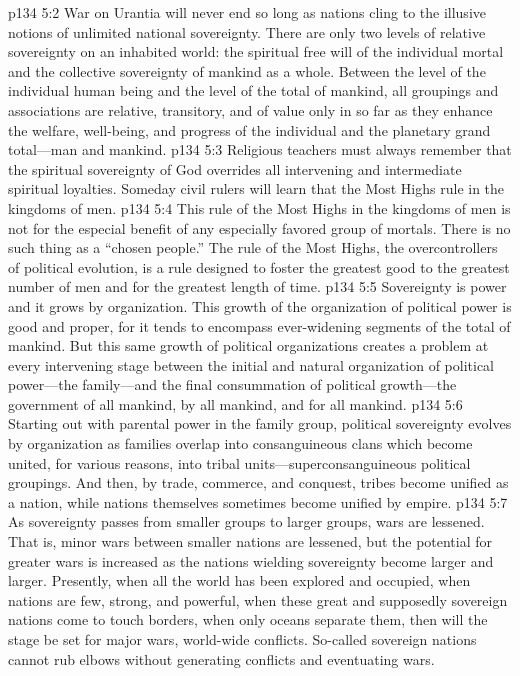 \pc \vs p134 5:2 War on Urantia will never end so long as nations cling to the illusive notions of unlimited national sovereignty. There are only two levels of relative sovereignty on an inhabited world: the spiritual free will of the individual mortal and the collective sovereignty of mankind as a whole. Between the level of the individual human being and the level of the total of mankind, all groupings and associations are relative, transitory, and of value only in so far as they enhance the welfare, well\hyp{}being, and progress of the individual and the planetary grand total---man and mankind.
\vs p134 5:3 Religious teachers must always remember that the spiritual sovereignty of God overrides all intervening and intermediate spiritual loyalties. Someday civil rulers will learn that the Most Highs rule in the kingdoms of men.
\vs p134 5:4 This rule of the Most Highs in the kingdoms of men is not for the especial benefit of any especially favored group of mortals. There is no such thing as a “chosen people.” The rule of the Most Highs, the overcontrollers of political evolution, is a rule designed to foster the greatest good to the greatest number of  men and for the greatest length of time.
\vs p134 5:5 Sovereignty is power and it grows by organization. This growth of the organization of political power is good and proper, for it tends to encompass ever\hyp{}widening segments of the total of mankind. But this same growth of political organizations creates a problem at every intervening stage between the initial and natural organization of political power---the family---and the final consummation of political growth---the government of all mankind, by all mankind, and for all mankind.
\vs p134 5:6 Starting out with parental power in the family group, political sovereignty evolves by organization as families overlap into consanguineous clans which become united, for various reasons, into tribal units---superconsanguineous political groupings. And then, by trade, commerce, and conquest, tribes become unified as a nation, while nations themselves sometimes become unified by empire.
\vs p134 5:7 As sovereignty passes from smaller groups to larger groups, wars are lessened. That is, minor wars between smaller nations are lessened, but the potential for greater wars is increased as the nations wielding sovereignty become larger and larger. Presently, when all the world has been explored and occupied, when nations are few, strong, and powerful, when these great and supposedly sovereign nations come to touch borders, when only oceans separate them, then will the stage be set for major wars, world\hyp{}wide conflicts. So\hyp{}called sovereign nations cannot rub elbows without generating conflicts and eventuating wars.
